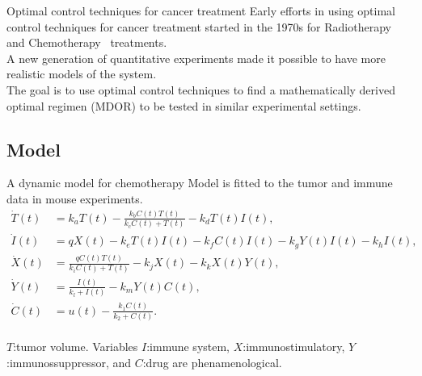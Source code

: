 \documentclass[10pt]{beamer}
\begin{document}
\begin{frame}{Optimal control techniques for cancer treatment}
	Early efforts in using optimal control techniques for cancer treatment started in the 1970s for Radiotherapy~ and Chemotherapy~ treatments. \\
	\vspace{0.5cm}
	A new generation of quantitative experiments made it possible to have more realistic models of the system. \\
	\vspace{0.5cm}
	The goal is to use optimal control techniques to find a mathematically derived optimal regimen (MDOR) to be tested in similar experimental settings.
\end{frame}

\subsection{Model}
\begin{frame}{A dynamic model for chemotherapy}
	\small
	Model is fitted to the tumor and immune data in mouse experiments.\\
	\begin{subequations} \label{eq:chemo1}
		\begin{align} 
			\dot{T}(t) &=  k_{a} T(t) - \frac{k_{b}C(t)T(t)}{k_{c}C(t)+T(t)} - k_{d}T(t)I(t),\\
			\dot{I}(t) &= q X(t) -k_{e}T(t)I(t)-k_{f}C(t)I(t)-k_{g}Y(t)I(t)-k_{h}I(t),\\
			\dot{X}(t) &= \frac{q C(t)T(t)}{k_{i}C(t)+T(t)}-k_{j}X(t)-k_{k}X(t)Y(t),\\
			\dot{Y}(t) &= \frac{I(t)}{k_l+I(t)} - k_{m}Y(t) C(t),\\
			\dot{C}(t) &= u(t) - \frac{k_1 C(t)}{k_2 + C(t)}.
		\end{align}
	\end{subequations} \\ 
	$T$:tumor volume. Variables $I$:immune system, $X$:immunostimulatory, $Y$:immunossuppressor, and $C$:drug are phenamenological. 
\end{frame}

%	
\end{document}
